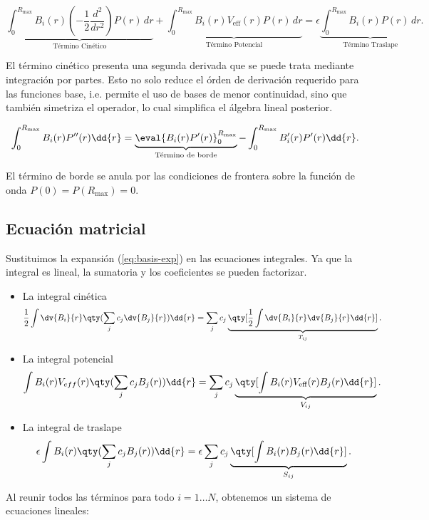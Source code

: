 \[ \underbrace{\int_{0}^{R_{\text{max}}} B_i(r) \left( -\frac{1}{2} \frac{d^2}{dr^2} \right) P(r) \, dr}_{\text{Término Cinético}} + \underbrace{\int_{0}^{R_{\text{max}}} B_i(r) V_{\text{eff}}(r) P(r) \, dr}_{\text{Término Potencial}} = \epsilon \underbrace{\int_{0}^{R_{\text{max}}} B_i(r) P(r) \, dr}_{\text{Término Traslape}}. \]

El término cinético presenta una segunda derivada que se puede trata mediante integración por partes. Esto no solo reduce el órden de derivación requerido para las funciones base, i.e. permite el uso de bases de menor continuidad, sino que también simetriza el operador, lo cual simplifica el álgebra lineal posterior.

\begin{equation} \label{eq:k-ibp}
  \int_{0}^{R_{\text{max}}} B_i(r) P''(r) \dd{r} = \underbrace{\eval{ B_i(r) P'(r) }_{0}^{R_{\text{max}}}}_{\text{Término de borde}} - \int_{0}^{R_{\text{max}}} B_i'(r) P'(r) \dd{r}.
\end{equation}

El término de borde se anula por las condiciones de frontera sobre la función de onda \( P(0) = P(R_{\text{max}})=0 \).

\subsection{Ecuación matricial}

Sustituimos la expansión (\cref{eq:basis-exp}) en las ecuaciones integrales. Ya que la integral es lineal, la sumatoria y los coeficientes se pueden factorizar.

\begin{itemize}
\item La integral cinética
  \[ \frac{1}{2} \int \dv{B_i}{r} \qty(\sum_jc_j\dv{B_{j}}{r})\dd{r} = \sum_jc_j\underbrace{\qty[\frac{1}{2}\int \dv{B_i}{r}\dv{B_j}{r}\dd{r}]}_{T_{ij}}. \]
\item La integral potencial
  \[ \int B_i(r)V_{eff}(r) \qty(\sum_jc_jB_j(r)) \dd{r} = \sum_jc_j \underbrace{\qty[\int B_i(r)V_{\text{eff}}(r)B_j(r)\dd{r}]}_{V_{ij}}. \]
\item La integral de traslape
  \[ \epsilon \int B_i(r) \qty(\sum_jc_jB_j(r)) \dd{r} = \epsilon \sum_jc_j \underbrace{\qty[\int B_i(r)B_j(r)\dd{r}]}_{S_{ij}}. \]
\end{itemize}

Al reunir todos las términos para todo \( i = 1 \dots N \), obtenemos un sistema de ecuaciones lineales:

